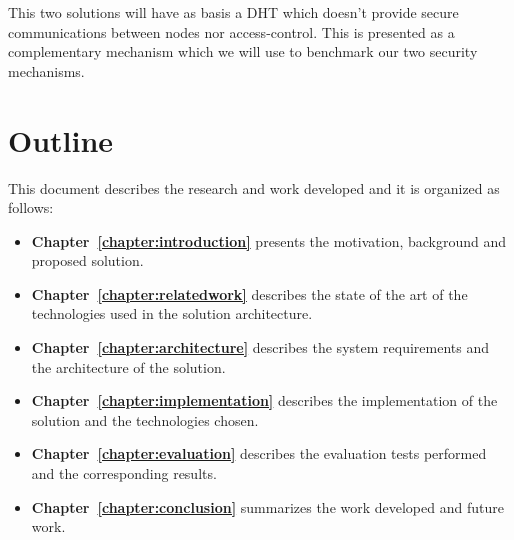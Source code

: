 This two solutions will have as basis a \ac{DHT} which doesn't provide secure communications between nodes nor access-control.
This is presented as a complementary mechanism which we will use to benchmark our two security mechanisms.

\section{Outline}
This document describes the research and work developed and it is organized as follows:

\begin{itemize}
  \item \textbf{Chapter~\ref{chapter:introduction}} presents the motivation, background and proposed solution.
  \item \textbf{Chapter~\ref{chapter:relatedwork}} describes the state of the art of the technologies used in the solution architecture.
  \item \textbf{Chapter~\ref{chapter:architecture}} describes the system requirements and the architecture of the solution.
  \item \textbf{Chapter~\ref{chapter:implementation}} describes the implementation of the solution and the technologies chosen.
  \item \textbf{Chapter~\ref{chapter:evaluation}} describes the evaluation tests performed and the corresponding results.
  \item \textbf{Chapter~\ref{chapter:conclusion}} summarizes the work developed and future work.
\end{itemize}

\cleardoublepage
